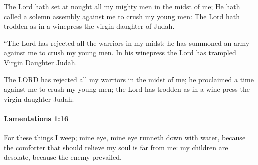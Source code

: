 			\begin{versebox}
					\item[BHS] 
					\item[LXX] 
					\item[ASV] The Lord hath set at nought all my mighty men in the midst of me; He hath called a solemn assembly against me to crush my young men: The Lord hath trodden as in a winepress the virgin daughter of Judah.
					\item[NIV] “The Lord has rejected all the warriors in my midst; he has summoned an army against me to crush my young men. In his winepress the Lord has trampled Virgin Daughter Judah.
					\item[NRSV] The LORD has rejected all my warriors in the midst of me; he proclaimed a time against me to crush my young men; the Lord has trodden as in a wine press the virgin daughter Judah.
			\end{versebox}

		\paragraph{Lamentations 1:16} %
			\label{LAMENTATIONS-1-16}

			For these things I weep; mine eye, mine eye runneth down with water, because the comforter that should relieve my soul is far from me: my children are desolate, because the enemy prevailed.

